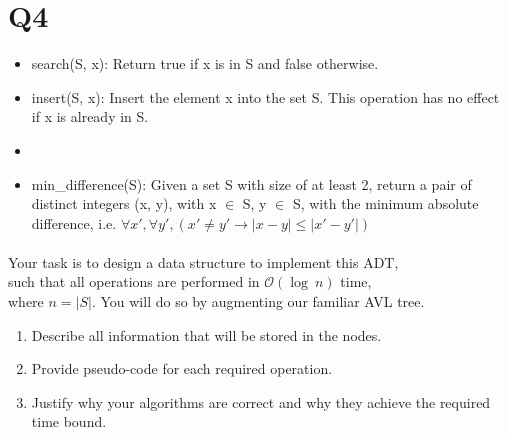 \documentclass{article}
\begin{document}
\newpage

\section*{Q4}

\begin{itemize}
    \item search(S, x): Return true if x is in S and false otherwise.
    \item insert(S, x): Insert the element x into the set S.
          This operation has no effect if x is already in S.
    \item {}
    \item min\_difference(S): Given a set S with size of at least 2, return a pair of distinct integers (x, y),
          \newline
          with x $\in$ S, y $\in$ S, with the minimum absolute difference, i.e.
          \newline
          $\forall x', \forall y', (x' \neq y' \rightarrow |x - y| \leq |x' - y'|)$
\end{itemize}
\paragraph{}
Your task is to design a data structure to implement this ADT, \\
such that all operations are performed in $\mathcal{O} (\log\ n)$ time, \\
where $n = |S|$. You will do so by augmenting our familiar AVL tree.

\begin{enumerate}
    \item Describe all information that will be stored in the nodes.
    \item Provide pseudo-code for each required operation.
    \item Justify why your algorithms are correct and why they achieve the required time bound.
\end{enumerate}

\newpage
\end{document}
